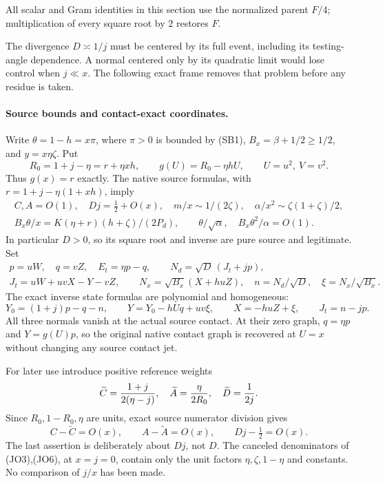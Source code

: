 All scalar and Gram identities in this section use the normalized
parent $F/4$; multiplication of every square root by $2$ restores $F$.

The divergence $D\asymp1/j$ must be centered by its full event,
including its testing-angle dependence. A normal centered only by its
quadratic limit would lose control when $j\ll x$. The following exact
frame removes that problem before any residue is taken.

\paragraph{Source bounds and contact-exact coordinates.}
Write $\theta=1-h=x\pi$, where $\pi>0$ is bounded by (SB1),
$B_x=\beta+1/2\ge1/2$, and $y=x\eta\zeta$. Put
\[
 R_0=1+j-\eta=r+\eta xh,\qquad
 g(U)=R_0-\eta hU,\qquad U=u^2,\ V=v^2.
                                                               \tag{JO2}
\]
Thus $g(x)=r$ exactly. The native source formulas, with
$r=1+j-\eta(1+xh)$, imply
\[
 \begin{gathered}
 C,A=O(1),\quad Dj=\tfrac12+O(x),\quad
 m/x\sim1/(2\zeta),\quad
 \alpha/x^2\sim\zeta(1+\zeta)/2,\\
 B_x\theta/x=K(\eta+r)(h+\zeta)/(2P_d),\qquad
 \theta/\sqrt\alpha,\quad B_x\theta^2/\alpha=O(1).
 \end{gathered}                                                \tag{JO3}
\]
In particular $D>0$, so its square root and inverse are pure source
and legitimate. Set
\[
 \begin{gathered}
 p=uW,\quad q=vZ,\quad E_t=\eta p-q,\qquad
 N_d=\sqrt D\,(J_t+jp),\\
 J_t=uW+uvX-Y-vZ,\qquad
 N_x=\sqrt{B_x}(X+huZ),\quad
 n=N_d/\sqrt D,\quad \xi=N_x/\sqrt{B_x}.
 \end{gathered}                                                \tag{JO4}
\]
The exact inverse state formulas are polynomial and homogeneous:
\[
 Y_0=(1+j)p-q-n,\qquad
 Y=Y_0-hUq+uv\xi,\qquad X=-huZ+\xi,\qquad
 J_t=n-jp.                                             \tag{JO5}
\]
All three normals vanish at the actual source contact. At their zero
graph, $q=\eta p$ and $Y=g(U)p$, so the original native contact
graph is recovered at $U=x$ without changing any source contact jet.

For later use introduce positive reference weights
\[
 \widetilde C={1+j\over2(\eta-j)},\quad
 \widetilde A={\eta\over2R_0},\quad
 \widetilde D={1\over2j}.
\]
Since $R_0,1-R_0,\eta$ are units, exact source numerator division gives
\[
 C-\widetilde C=O(x),\qquad A-\widetilde A=O(x),\qquad
 Dj-\tfrac12=O(x).                                    \tag{JO6}
\]
The last assertion is deliberately about $Dj$, not $D$. The canceled
denominators of (JO3),(JO6), at $x=j=0$, contain only the unit
factors $\eta,\zeta,1-\eta$ and constants. No comparison of $j/x$
has been made.

